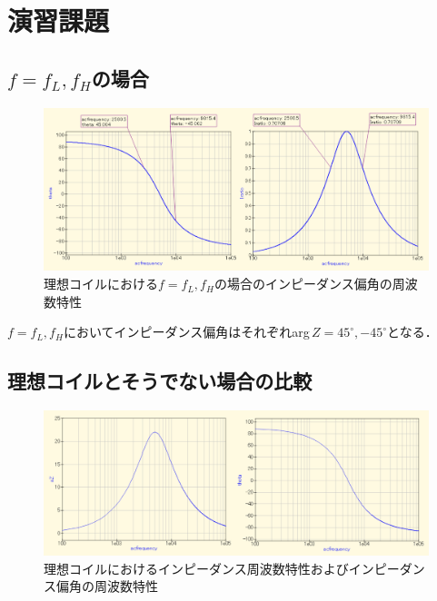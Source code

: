 
\section{演習課題}

\subsection{$f=f_L,f_H$の場合}
\begin{figure}[H]
    \begin{center}
        \includegraphics[scale=0.5]{45.pdf}
        \caption{理想コイルにおける$f=f_L,f_H$の場合のインピーダンス偏角の周波数特性}
    \end{center}
\end{figure}

$f=f_L,f_H$においてインピーダンス偏角はそれぞれarg\,$Z=45^\circ,-45^\circ$となる．

\subsection{理想コイルとそうでない場合の比較}
\begin{figure}[H]
    \begin{center}
        \includegraphics[scale=0.5]{ideal.pdf}
        \caption{理想コイルにおけるインピーダンス周波数特性およびインピーダンス偏角の周波数特性}
    \end{center}
\end{figure}

